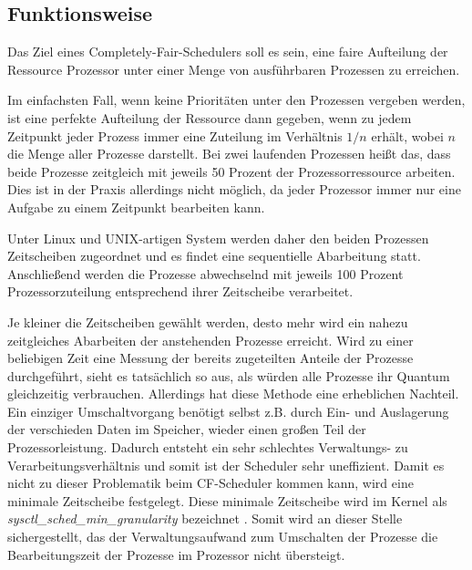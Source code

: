 \subsection{Funktionsweise}\label{s:cfs_fktweise}


Das Ziel eines  Completely-Fair-Schedulers{} soll es sein, eine faire Aufteilung der Ressource Prozessor unter einer Menge von ausführbaren Prozessen zu erreichen.


Im einfachsten Fall, wenn keine Prioritäten unter den Prozessen vergeben werden, ist eine perfekte Aufteilung der Ressource dann gegeben, wenn zu jedem Zeitpunkt jeder Prozess immer eine Zuteilung im Verhältnis $1/n$ erhält, wobei $n$ die Menge aller Prozesse darstellt.
Bei zwei laufenden Prozessen heißt das, dass beide Prozesse zeitgleich mit jeweils 50 Prozent der Prozessorressource arbeiten. Dies ist in der Praxis allerdings nicht möglich, da jeder Prozessor immer nur eine Aufgabe zu einem Zeitpunkt bearbeiten kann.

Unter Linux und UNIX-artigen System werden daher den beiden Prozessen Zeitscheiben zugeordnet und es findet eine sequentielle Abarbeitung statt. Anschließend werden die Prozesse abwechselnd mit jeweils 100 Prozent Prozessorzuteilung entsprechend ihrer Zeitscheibe verarbeitet.

Je kleiner die Zeitscheiben gewählt werden, desto mehr wird ein nahezu zeitgleiches Abarbeiten der anstehenden Prozesse erreicht.
Wird zu einer beliebigen Zeit eine Messung der bereits zugeteilten Anteile der Prozesse durchgeführt, sieht es tatsächlich so aus, als wür\-den alle Prozesse ihr Quantum gleichzeitig verbrauchen.
Allerdings hat diese Methode eine erheblichen Nachteil. Ein einziger Umschalt\-vorgang be\-nötigt selbst z.B. durch Ein- und Auslagerung der verschieden Daten im Speicher, wieder einen großen Teil der Prozessorleistung. Dadurch entsteht ein sehr schlechtes Verwaltungs- zu Verarbeitungs\-verhält\-nis und somit ist der Scheduler sehr uneffizient. Damit es nicht zu dieser Problematik beim CF-Scheduler kommen kann, wird eine minimale Zeitscheibe festgelegt. Diese minimale Zeitscheibe wird im Kernel als \textit{sysctl\_sched\_min\_granu\-larity} bezeichnet \cite{paperfairness}.
Somit wird an dieser Stelle sichergestellt, das der Verwaltungsaufwand zum Umschalten der Prozesse die Bearbeitungszeit der Prozesse im Prozessor nicht übersteigt.



